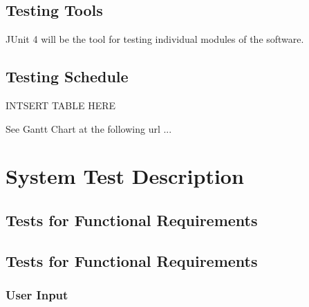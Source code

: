 \documentclass[12pt, titlepage]{article}
\begin{document}
\subsection{Testing Tools}
\par JUnit 4 will be the tool for testing individual modules of the software.
\subsection{Testing Schedule}

INTSERT TABLE HERE
		
See Gantt Chart at the following url ...
\section{System Test Description}
	
\subsection{Tests for Functional Requirements}
\subsection{Tests for Functional Requirements}
\subsubsection{User Input}
		
\end{document}
